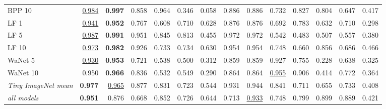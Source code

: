 \begin{table}[htbp]
\begin{adjustbox}{max width=\linewidth}
\begin{tabular}{lrrrrrrrrrrrrr}
BPP 10 & \underline{0.984} & \textbf{0.997} & 0.858 & 0.964 & \textcolor{black!45}{0.346} & \textcolor{black!45}{0.058} & 0.886 & 0.886 & 0.732 & 0.827 & 0.804 & 0.647 & \textcolor{black!45}{0.417} \\
LF 1 & \underline{0.941} & \textbf{0.952} & 0.767 & 0.608 & 0.710 & 0.628 & 0.876 & 0.876 & 0.692 & 0.783 & 0.632 & 0.710 & \textcolor{black!45}{0.298} \\
LF 5 & \underline{0.987} & \textbf{0.991} & 0.951 & 0.845 & 0.813 & \textcolor{black!45}{0.455} & 0.972 & 0.972 & 0.542 & \textcolor{black!45}{0.483} & 0.507 & 0.557 & \textcolor{black!45}{0.380} \\
LF 10 & \underline{0.973} & \textbf{0.982} & 0.926 & 0.733 & 0.734 & 0.630 & 0.954 & 0.954 & 0.748 & 0.660 & 0.856 & 0.686 & \textcolor{black!45}{0.466} \\
WaNet 5 & \underline{0.930} & \textbf{0.953} & 0.721 & 0.538 & 0.500 & \textcolor{black!45}{0.312} & 0.859 & 0.859 & 0.927 & 0.755 & \textcolor{black!45}{0.228} & 0.638 & \textcolor{black!45}{0.325} \\
WaNet 10 & 0.950 & \textbf{0.966} & 0.836 & 0.532 & 0.549 & \textcolor{black!45}{0.290} & 0.864 & 0.864 & \underline{0.955} & 0.906 & \textcolor{black!45}{0.414} & 0.772 & \textcolor{black!45}{0.364} \\
\rowcolor{black!8}\emph{Tiny ImageNet mean} & \textbf{0.977} & \underline{0.965} & 0.877 & 0.831 & 0.723 & 0.544 & 0.931 & 0.944 & 0.841 & 0.711 & 0.655 & 0.733 & \textcolor{black!45}{0.408} \\
\rowcolor{black!8}\emph{all models} & \textbf{0.951} & 0.876 & 0.668 & 0.852 & 0.726 & 0.644 & 0.713 & \underline{0.933} & 0.748 & 0.799 & 0.899 & 0.889 & \textcolor{black!45}{0.421} \\
\bottomrule
\end{tabular}
\end{adjustbox}
\end{table}
